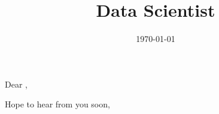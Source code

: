 \documentclass[11pt,a4paper,sans]{moderncv}
\title{Data Scientist}
\begin{document}
\clearpage

\recipient{}{\\} 
\date{\today} 
\opening{Dear ,} 
\closing{Hope to hear from you soon,} 

\makelettertitle 


\makeletterclosing
\end{document}
